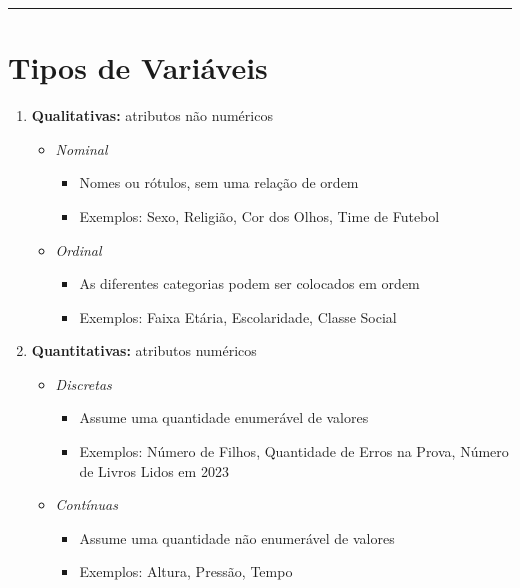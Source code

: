 \documentclass[
]{book}
\providecommand{\tightlist}{%
  \setlength{\itemsep}{0pt}\setlength{\parskip}{0pt}}
\begin{document}
\begin{center}\rule{0.5\linewidth}{0.5pt}\end{center}

\section{Tipos de Variáveis}\label{tipos-de-variuxe1veis}

\begin{enumerate}
\def\labelenumi{\arabic{enumi}.}
\tightlist
\item
  \textbf{Qualitativas:} atributos não numéricos

  \begin{itemize}
  \tightlist
  \item
    \emph{Nominal}

    \begin{itemize}
    \tightlist
    \item
      Nomes ou rótulos, sem uma relação de ordem\\
    \item
      Exemplos: Sexo, Religião, Cor dos Olhos, Time de Futebol\\
    \end{itemize}
  \item
    \emph{Ordinal}

    \begin{itemize}
    \tightlist
    \item
      As diferentes categorias podem ser colocados em ordem\\
    \item
      Exemplos: Faixa Etária, Escolaridade, Classe Social
    \end{itemize}
  \end{itemize}
\item
  \textbf{Quantitativas:} atributos numéricos

  \begin{itemize}
  \tightlist
  \item
    \emph{Discretas}

    \begin{itemize}
    \tightlist
    \item
      Assume uma quantidade enumerável de valores\\
    \item
      Exemplos: Número de Filhos, Quantidade de Erros na Prova, Número de Livros Lidos em 2023
    \end{itemize}
  \item
    \emph{Contínuas}

    \begin{itemize}
    \tightlist
    \item
      Assume uma quantidade não enumerável de valores\\
    \item
      Exemplos: Altura, Pressão, Tempo
    \end{itemize}
  \end{itemize}
\end{enumerate}
\end{document}
